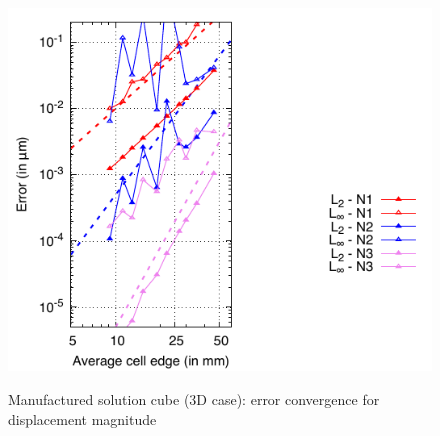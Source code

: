 \documentclass[sn-mathphys,Numbered]{sn-jnl}%
\begin{document}
\begin{figure}[H]
{    		\includegraphics[scale=0.8]{figures/mms/3D/mms_dispErrors_ho-tet-unstruct}  
    }
 	\caption{Manufactured solution cube (3D case): error convergence for displacement magnitude}
 	\label{fig:jj}
 \end{figure}
 
\end{document}
